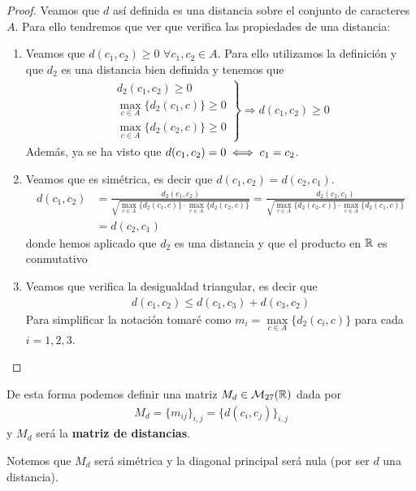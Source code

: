 \documentclass[12pt]{article}
\begin{document}
\begin{proof}
    Veamos que $d$ así definida es una distancia sobre el conjunto de caracteres $A$. Para ello tendremos que ver que verifica las propiedades de una distancia:
    \begin{enumerate}
        \item Veamos que $d(c_1, c_2)\geq 0$ $\forall c_1,c_2\in A$. Para ello utilizamos la definición y que $d_2$ es una distancia bien definida y tenemos que 
        \begin{align*}
            \left.
            \begin{array}{c}
                d_2(c_1,c_2) \geq 0\\
                \max\limits_{c\in A}\{d_2(c_1, c)\} \geq 0\\
                \max\limits_{c\in A}\{d_2(c_2, c)\} \geq 0
            \end{array}
            \right\}
            \Rightarrow d(c_1,c_2) \geq 0
        \end{align*}
        Además, ya se ha visto que $d(c_1, c_2) = 0 \iff c_1=c_2$.

        \item Veamos que es simétrica, es decir que $d(c_1, c_2)=d(c_2,c_1)$.
        \begin{align*}
            d(c_1,c_2) &= \frac{d_2(c_1, c_2)}{\sqrt{\max\limits_{c\in A}\{d_2(c_1, c)\} \cdot \max\limits_{c\in A}\{d_2(c_2, c)\}}} = 
            \frac{d_2(c_2, c_1)}{\sqrt{\max\limits_{c\in A}\{d_2(c_2, c)\} \cdot \max\limits_{c\in A}\{d_2(c_1, c)\}}} \\
            &= d(c_2,c_1)
        \end{align*}
        donde hemos aplicado que $d_2$ es una distancia y que el producto en $\mathbb{R}$ es conmutativo
        \item Veamos que verifica la desigualdad triangular, es decir que
        \begin{align*}
            d(c_1,c_2) \leq d(c_1, c_3) + d(c_3,c_2)
        \end{align*}
        Para simplificar la notación tomaré como $m_i=\max\limits_{c\in A}\{d_2(c_i, c)\}$ para cada $i=1,2,3$.

    \end{enumerate}
\end{proof}

De esta forma podemos definir una matriz $M_d\in \mathcal{M}_{27}(\mathbb{R})$ dada por 
\begin{align*}
    M_d=\{m_{ij}\}_{i,j} = \{d(c_i, c_j)\}_{i,j}
\end{align*}
y $M_d$ será la \textbf{matriz de distancias}.

Notemos que $M_d$ será simétrica y la diagonal principal será nula (por ser $d$ una distancia).
\end{document}
